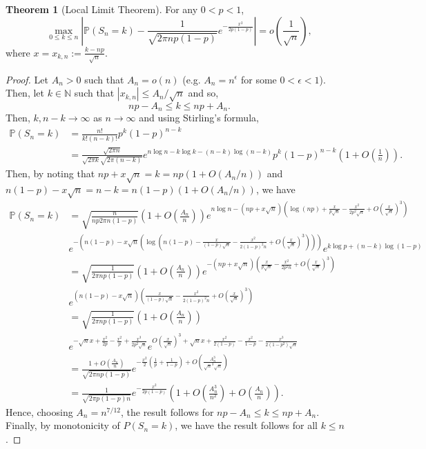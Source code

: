 \documentclass[]{article}
\theoremstyle{definition}
\newtheorem{theorem}{Theorem}
\theoremstyle{definition}
\begin{document}
\begin{theorem}[Local Limit Theorem]
  For any \(0 < p < 1\), 
  \[\max_{0 \le k \le n} \left|\mathbb{P}(S_n = k) - \frac{1}{\sqrt{2\pi np(1 - p)}}e^{- \frac{x^2}{2p(1 - p)}} \right| 
  = o\left(\frac{1}{\sqrt{n}}\right),\]
  where \(x = x_{k, n} := \frac{k - np}{\sqrt{n}}\).
\end{theorem}
\begin{proof}
  Let \(A_n > 0\) such that \(A_n = o(n)\) (e.g. \(A_n = n^\epsilon\) for some \(0 < \epsilon < 1\)).
  Then, let \(k \in \mathbb{N}\) such that \(|x_{k, n}| \le A_n / \sqrt{n}\) and so, 
  \[np - A_n \le k \le np + A_n.\]
  Then, \(k, n- k \to \infty\) as \(n \to \infty\) and using Stirling's formula,
  \[\begin{split}
    \mathbb{P}(S_n = k) & = \frac{n!}{k!(n - k)!}p^k(1 - p)^{n - k}\\ 
    & = \frac{\sqrt{2\pi n}}{\sqrt{2\pi k}{\sqrt{2\pi (n - k)}}}
        e^{n \log n - k \log k - (n - k)\log(n - k)}p^k (1 - p)^{n - k}\left(1 + O\left(\frac{1}{n}\right)\right).
  \end{split}\]
  Then, by noting that \(np + x \sqrt{n} = k = np(1 + O(A_n / n))\) and 
  \(n(1 - p) - x\sqrt{n} = n - k = n(1 - p)(1 + O(A_n / n))\), we have 
  \[\begin{split}
    \mathbb{P}(S_n = k) & =
    \sqrt{\frac{n}{np2\pi n(1 - p)}}\left(1 + O\left(\frac{A_n}{n}\right)\right)
    e^{n \log n - (np + x\sqrt{n})(\log(np) + \frac{x}{p\sqrt{n}} - \frac{x^2}{2p^2\sqrt{n}} + O\left(\frac{x}{\sqrt{n}}\right)^3)}\\
    & e^{-(n(1 - p) - x\sqrt{n}(\log(n(1 - p) - \frac{x}{(1 - p)\sqrt{n}} - \frac{x^2}{2(1 - p)^2 n} + O\left(\frac{x}{\sqrt{n}}\right)^3)))}
    e^{k\log p + (n - k)\log(1 - p)}\\
    & = \sqrt{\frac{1}{2\pi n p(1 - p)}} \left(1 + O\left(\frac{A_n}{n}\right)\right)
    e^{-(np + x\sqrt{n})(\frac{x}{p\sqrt{n}} - \frac{x^2}{2p^2 n} + O\left(\frac{x}{\sqrt{n}}\right)^3)}\\
    & e^{(n(1 - p) - x\sqrt{n})(\frac{x}{(1 - p)\sqrt{n}} - \frac{x^2}{2(1 - p)^2 n} + O\left(\frac{x}{\sqrt{n}}\right)^3)}\\
    & = \sqrt{\frac{1}{2\pi n p(1 - p)}} \left(1 + O\left(\frac{A_n}{n}\right)\right)\\
    & e^{-\sqrt{n} x + \frac{x^2}{2p} - \frac{x^2}{p} +\frac{x^3}{2p^2 \sqrt{n}}}
    e^{O\left(\frac{x}{\sqrt{n}}\right)^3 + \sqrt{n}x + \frac{x^2}{2(1 - p)} - \frac{x^2}{1 - p} -\frac{x^3}{2(1 - p^2)\sqrt{n}}}\\
    & = \frac{1 + O\left(\frac{A_n}{n}\right)}{\sqrt{2\pi n p(1 - p)}} 
      e^{-\frac{x^2}{2}(\frac{1}{p} + \frac{1}{1 - p}) + O\left(\frac{A_n^3}{\sqrt{n}^3 \sqrt{n}}\right)}\\
    & = \frac{1}{\sqrt{2\pi p(1 - p)n}} e^{-\frac{x^2}{2p(1 - p)}}\left(1 + O\left(\frac{A_n^3}{n^2}\right) + 
      O\left(\frac{A_n}{n}\right)\right).
  \end{split}\]
  Hence, choosing \(A_n = n^{7 / 12}\), the result follows for \(np - A_n \le k \le np + A_n\). 
  Finally, by monotonicity of \(P(S_n = k)\), we have the result follows for all \(k \le n\).
\end{proof}
\end{document}
